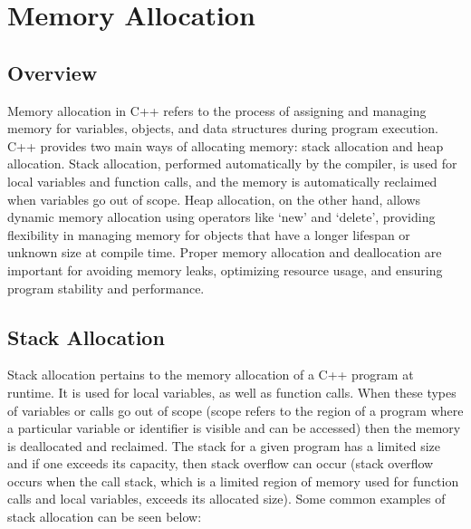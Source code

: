 \section*{Memory Allocation}

\subsection*{Overview}

Memory allocation in C++ refers to the process of assigning and managing memory for variables, objects, and data structures during program execution. C++ provides two main ways of allocating memory: 
stack allocation and heap allocation. Stack allocation, performed automatically by the compiler, is used for local variables and function calls, and the memory is automatically reclaimed when variables 
go out of scope. Heap allocation, on the other hand, allows dynamic memory allocation using operators like `new' and `delete', providing flexibility in managing memory for objects that have a longer 
lifespan or unknown size at compile time. Proper memory allocation and deallocation are important for avoiding memory leaks, optimizing resource usage, and ensuring program stability and performance.

\subsection*{Stack Allocation}

Stack allocation pertains to the memory allocation of a C++ program at runtime. It is used for local variables, as well as function calls. When these types of variables or calls go out of scope 
(scope refers to the region of a program where a particular variable or identifier is visible and can be accessed) then the memory is deallocated and reclaimed. The stack for a given program has
a limited size and if one exceeds its capacity, then stack overflow can occur (stack overflow occurs when the call stack, which is a limited region of memory used for function calls and local variables, 
exceeds its allocated size). Some common examples of stack allocation can be seen below:

